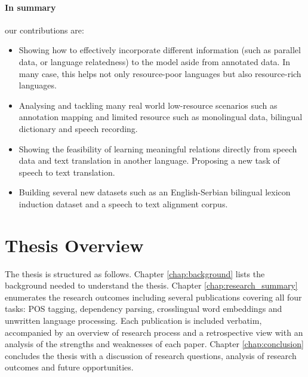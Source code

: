 \documentclass[12pt,twoside,final,hidelinks]{ltthesis}
\theoremstyle{definition}
\begin{document}
\paragraph{In summary} our contributions are:
\begin{itemize}
\item Showing how to effectively incorporate different information (such as parallel data, or language relatedness) to the model aside from annotated data. In many case, this helps not only resource-poor languages but also resource-rich languages. 
\item Analysing and tackling many real world low-resource scenarios such as annotation mapping and limited resource such as monolingual data, bilingual dictionary and speech recording. 
\item Showing the feasibility of learning meaningful relations directly from speech data and text translation in another language. Proposing a new task of speech to text translation. 
\item Building several new datasets such as an English-Serbian bilingual lexicon induction dataset and a speech to text alignment corpus. 
\end{itemize}
\section{Thesis Overview}
The thesis is structured as follows. 
Chapter \ref{chap:background} lists the background needed to understand the thesis. Chapter \ref{chap:research_summary} enumerates the research outcomes 
including several publications covering all four tasks: POS tagging, dependency parsing, crosslingual word embeddings and unwritten language processing. 
Each publication is included verbatim, accompanied by an overview of research process and a retrospective view with an analysis of the strengths and weaknesses of each paper. Chapter \ref{chap:conclusion} concludes the thesis with a discussion of research questions, analysis of research outcomes and future opportunities. 


%
\end{document}

